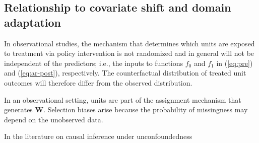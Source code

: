 \documentclass[hidelinks,12pt]{article}
\begin{document}
\subsection{Relationship to covariate shift and domain adaptation}

In observational studies, the mechanism that determines which units are exposed to treatment via policy intervention is not randomized and in general will not be independent of the predictors; i.e., the inputs to functions $f_0$ and $f_1$ in (\ref{eq:pre}) and (\ref{eq:ar-post}), respectively. The counterfactual distribution of treated unit outcomes will therefore differ from the observed distribution. 


In an observational setting, units are part of the assignment mechanism that generates $\mathbf{W}$. Selection biases arise because the probability of missingness may depend on the unobserved data. 

In the literature on causal inference under unconfoundedness  \citep{imbens2015causal}




\end{document}
